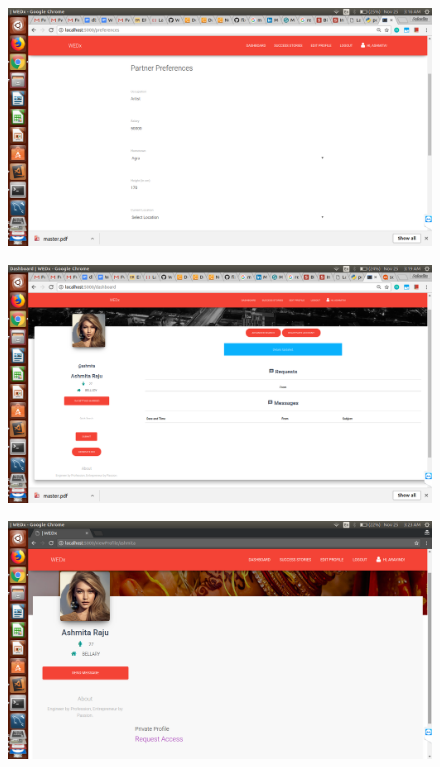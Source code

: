\documentclass[12pt]{report}
\begin{document}
\begin{figure}[!htb]
    \centering
    \includegraphics[width=1\textwidth]{sc-8.png}
\end{figure}

\begin{figure}[!htb]
    \centering
    \includegraphics[width=1\textwidth]{sc-9.png}
\end{figure}

\begin{figure}[!htb]
    \centering
    \includegraphics[width=1\textwidth]{sc-10.png}
\end{figure}
\end{document}
